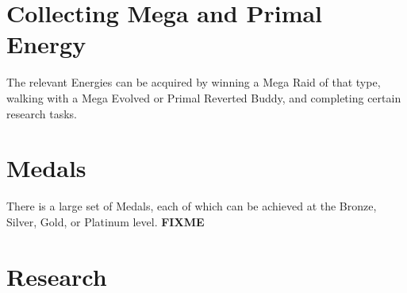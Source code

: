 \section{Collecting Mega and Primal Energy}
The relevant Energies can be acquired by winning a Mega Raid of that type,
  walking with a Mega Evolved or Primal Reverted Buddy, and completing
  certain research tasks.

\section{Medals}
There is a large set of Medals, each of which can be achieved at the Bronze,
 Silver, Gold, or Platinum level.
\textbf{FIXME}

\section{Research}
\label{section:research}

